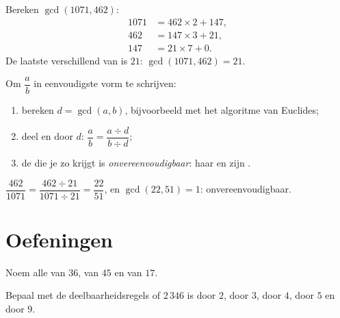 \begin{example}\label{ex:g9:arith:euclidalgo}
Bereken $\gcd(1071, 462)$:
\begin{align*}
1071 &= 462 \times 2 + 147, \\
462 &= 147 \times 3 + 21, \\
147 &= 21 \times 7 + 0 .
\end{align*}
De laatste  verschillend van  is $21$: $\gcd(1071, 462) = 21$.
\end{example}

\begin{method}\label{met:g9:arith:simplify}
Om $\dfrac ab$ in eenvoudigste vorm te schrijven:
\begin{enumerate}
  \item bereken $d = \gcd(a, b)$, bijvoorbeeld met het algoritme van Euclides;
  \item deel  en  door $d$: $\dfrac ab = \dfrac{a \div d}{b \div d}$;
  \item de  die je zo krijgt is \emph{onvereenvoudigbaar}: haar  en
         zijn .
\end{enumerate}
\end{method}

\begin{example}
$\dfrac{462}{1071} = \dfrac{462 \div 21}{1071 \div 21} = \dfrac{22}{51}$, en
$\gcd(22, 51) = 1$: onvereenvoudigbaar.
\end{example}

\section{Oefeningen}

\begin{exercise}[$\star$]\label{exo:g9:arith:1}
Noem alle  van $36$, van $45$ en van $17$.
\end{exercise}

\begin{exercise}[$\star$]\label{exo:g9:arith:2}
Bepaal met de deelbaarheidsregels of $2\,346$  is door $2$, door $3$, door
$4$, door $5$ en door $9$.
\end{exercise}

